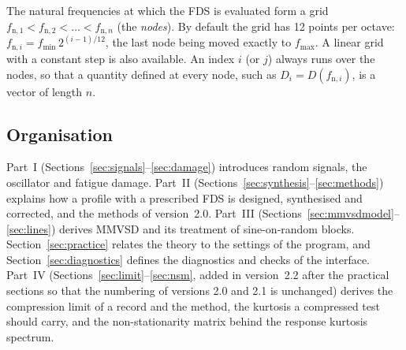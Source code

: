 The natural frequencies at which the FDS is evaluated form a grid $f_{\mathrm{n},1} <
f_{\mathrm{n},2} < \dots < f_{\mathrm{n},n}$ (the \emph{nodes}). By default the grid has 12 points per
octave: $f_{\mathrm{n},i} = f_{\min}\,2^{(i-1)/12}$, the last node being moved exactly to $f_{\max}$.
A linear grid with a constant step is also available. An index $i$ (or $j$) always runs over the
nodes, so that a quantity defined at every node, such as $D_i = D(f_{\mathrm{n},i})$, is a vector of
length $n$.

\subsection{Organisation}

Part~I (Sections~\ref{sec:signals}--\ref{sec:damage}) introduces random signals, the oscillator and
fatigue damage. Part~II (Sections~\ref{sec:synthesis}--\ref{sec:methods}) explains how a profile with
a prescribed FDS is designed, synthesised and corrected, and the methods of version~2.0. Part~III
(Sections~\ref{sec:mmvsdmodel}--\ref{sec:lines}) derives MMVSD and its treatment of
sine-on-random blocks. Section~\ref{sec:practice}
relates the theory to the settings of the program, and Section~\ref{sec:diagnostics} defines the
diagnostics and checks of the interface. Part~IV (Sections~\ref{sec:limit}--\ref{sec:nsm}, added in
version~2.2 after the practical sections so that the numbering of versions 2.0 and 2.1 is unchanged)
derives the compression limit of a record and the  method, the kurtosis a compressed test
should carry, and the non-stationarity matrix behind the response kurtosis spectrum.
